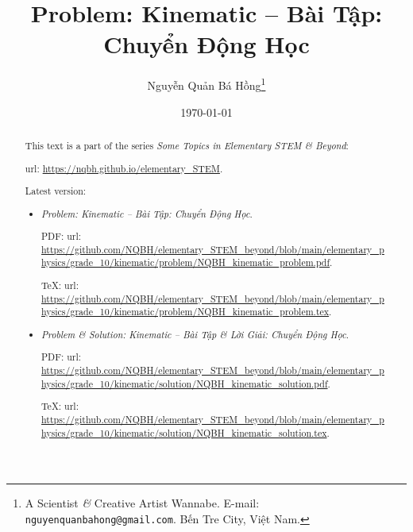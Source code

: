 \documentclass{article}
\title{Problem: Kinematic -- Bài Tập: Chuyển Động Học}
\author{Nguyễn Quản Bá Hồng\footnote{A Scientist {\it\&} Creative Artist Wannabe. E-mail: {\tt nguyenquanbahong@gmail.com}. Bến Tre City, Việt Nam.}}
\date{\today}
\begin{document}
\maketitle
\begin{abstract}
	This text is a part of the series {\it Some Topics in Elementary STEM \& Beyond}:
	
	{\sc url}: \url{https://nqbh.github.io/elementary_STEM}.
	
	Latest version:
	\begin{itemize}
		\item {\it Problem: Kinematic -- Bài Tập: Chuyển Động Học}.
		
		PDF: {\sc url}: \url{https://github.com/NQBH/elementary_STEM_beyond/blob/main/elementary_physics/grade_10/kinematic/problem/NQBH_kinematic_problem.pdf}.
		
		\TeX: {\sc url}: \url{https://github.com/NQBH/elementary_STEM_beyond/blob/main/elementary_physics/grade_10/kinematic/problem/NQBH_kinematic_problem.tex}.
		\item {\it Problem \& Solution: Kinematic -- Bài Tập \& Lời Giải: Chuyển Động Học}.
		
		PDF: {\sc url}: \url{https://github.com/NQBH/elementary_STEM_beyond/blob/main/elementary_physics/grade_10/kinematic/solution/NQBH_kinematic_solution.pdf}.
		
		\TeX: {\sc url}: \url{https://github.com/NQBH/elementary_STEM_beyond/blob/main/elementary_physics/grade_10/kinematic/solution/NQBH_kinematic_solution.tex}.
	\end{itemize}
\end{abstract}
\tableofcontents

\end{document}
